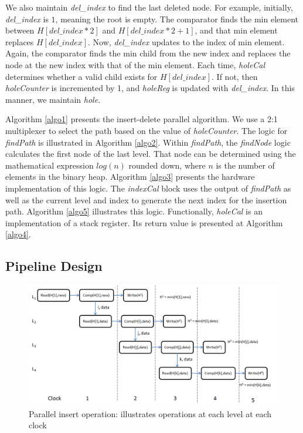 We also maintain {\it del\_index} to find the last deleted node.
For example, initially, {\it del\_index} is $1$, meaning the root is empty.
The comparator finds the min element between $H[del\_index*2]$ and $H[del\_index*2 + 1]$, and that min element replaces $H[del\_index]$.
Now, {\it del\_index} updates to the index of min element.
Again, the comparator finds the min child from the new index and replaces the node at the new index with that of the min element.
Each time, {\it holeCal} determines whether a valid child exists for $H[del\_index]$.
If not, then {\it holeCounter} is incremented by 1, and {\it holeReg} is updated with {\it del\_index}.
In this manner, we maintain {\it hole}.

Algorithm \ref{algo1} presents the insert-delete parallel algorithm.
We use a 2:1 multiplexer to select the path based on the value of {\it holeCounter}.
The logic for {\it findPath} is illustrated in Algorithm \ref{algo2}.
Within {\it findPath}, the {\it findNode} logic calculates the first node of the last level.
That node can be determined using the mathematical expression $log(n)$ rounded down, where $n$ is the number of elements in the binary heap.
Algorithm \ref{algo3} presents the hardware implementation of this logic.
The {\it indexCal} block uses the output of {\it findPath} as well as the current level and index to generate the next index for the insertion path. Algorithm \ref{algo5} illustrates this logic.
Functionally, {\it holeCal} is an implementation of a stack register. Its return value is presented at Algorithm \ref{algo4}.



\subsection{Pipeline Design}
\begin{figure}[!ht]
  \centering
  \includegraphics[width=12cm]{fig/clock1.png}
      \caption{Parallel insert operation: illustrates operations at each level at each clock }
    \label{clock1}
\end{figure}

